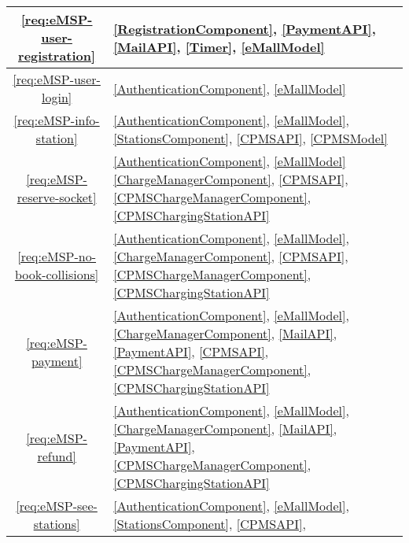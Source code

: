 \begin{table}[h]
    \begin{center}
        \begin{tabular}{|c||p{15.5cm}|}
            \hline
            \ref{req:eMSP-user-registration} & 
            \ref{RegistrationComponent},
            \ref{PaymentAPI},
            \ref{MailAPI},
            \ref{Timer},
            \ref{eMallModel} 
            \\
            \hline
            \ref{req:eMSP-user-login} & 
            \ref{AuthenticationComponent},
            \ref{eMallModel} 
            \\
            \hline
            \ref{req:eMSP-info-station} & 
            \ref{AuthenticationComponent},
            \ref{eMallModel},
            \ref{StationsComponent},
            \ref{CPMSAPI},
            \ref{CPMSModel}
            \\
            \hline
            \ref{req:eMSP-reserve-socket} &
            \ref{AuthenticationComponent},
            \ref{eMallModel} 
            \ref{ChargeManagerComponent},
            \ref{CPMSAPI},
            \ref{CPMSChargeManagerComponent},
            \ref{CPMSChargingStationAPI}
            \\
            \hline
            \ref{req:eMSP-no-book-collisions} &
            \ref{AuthenticationComponent},
            \ref{eMallModel},
            \ref{ChargeManagerComponent},
            \ref{CPMSAPI},
            \ref{CPMSChargeManagerComponent},
            \ref{CPMSChargingStationAPI}
            \\
            \hline
            \ref{req:eMSP-payment} &
            \ref{AuthenticationComponent},
            \ref{eMallModel},
            \ref{ChargeManagerComponent},
            \ref{MailAPI},
            \ref{PaymentAPI},
            \ref{CPMSAPI},
            \ref{CPMSChargeManagerComponent},
            \ref{CPMSChargingStationAPI}
            \\
            \hline
            \ref{req:eMSP-refund} &
            \ref{AuthenticationComponent},
            \ref{eMallModel},
            \ref{ChargeManagerComponent},
            \ref{MailAPI},
            \ref{PaymentAPI},
            \ref{CPMSChargeManagerComponent},
            \ref{CPMSChargingStationAPI}
            \\
            \hline
            \ref{req:eMSP-see-stations} &
            \ref{AuthenticationComponent},
            \ref{eMallModel},
            \ref{StationsComponent},
            \ref{CPMSAPI},

\end{tabular}
\end{center}
\end{table}
